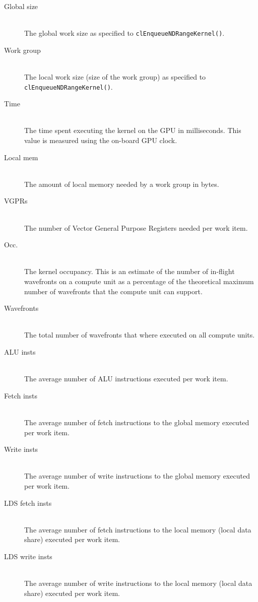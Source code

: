 \begin{table}
		\begin{description}
		   \item[Global size] \hfill \\
		   The global work size as specified to \lstinline!clEnqueueNDRangeKernel()!.
		   \item[Work group] \hfill \\
		   The local work size (size of the work group) as specified to \lstinline!clEnqueueNDRangeKernel()!.
		   \item[Time] \hfill \\
		   The time spent executing the kernel on the GPU in milliseconds. This value is measured using the on-board GPU clock.
		   \item[Local mem] \hfill \\
		   The amount of local memory needed by a work group in bytes.
		   \item[VGPRs] \hfill \\
		   The number of Vector General Purpose Registers needed per work item.
		   \item[Occ.] \hfill \\
		   The kernel occupancy. This is an estimate of the number of in-flight wavefronts on a compute unit as a percentage of the theoretical maximum number of wavefronts that the compute unit can support.
		   \item[Wavefronts] \hfill \\
		   The total number of wavefronts that where executed on all compute units.
		   \item[ALU insts] \hfill \\
		   The average number of ALU instructions executed per work item.
		   \item[Fetch insts] \hfill \\
		   The average number of fetch instructions to the global memory executed per work item.
		   \item[Write insts] \hfill \\
		   The average number of write instructions to the global memory executed per work item.
		   \item[LDS fetch insts] \hfill \\
		   The average number of fetch instructions to the local memory (local data share) executed per work item.
		   \item[LDS write insts] \hfill \\
		   The average number of write instructions to the local memory (local data share) executed per work item.

\end{description}
\end{table}
